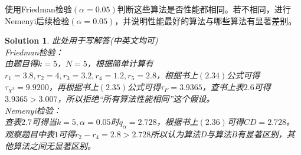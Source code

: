 \documentclass[a4paper,UTF8]{article}
\numberwithin{equation}{section}
\newtheorem*{mySol}{Solution}
\begin{document}
使用Friedman检验$(\alpha=0.05)$判断这些算法是否性能都相同。若不相同，进行Nemenyi后续检验$(\alpha=0.05)$，并说明性能最好的算法与哪些算法有显著差别。
\begin{mySol}
此处用于写解答(中英文均可)\\
Friedman检验：\\
由题目得$k=5$，$N=5$，根据简单计算有$r_1=3.8, r_2=4, r_3=3.2, r_4=1.2, r_5=2.8$，根据书上$(2.34)$公式可得$\tau_{\chi^2} = 9.9200$，再根据书上$(2.35)$公式可得$\tau_F=3.9365$，查书上表$2.6$可得$3.9365 > 3.007 $，所以拒绝“所有算法性能相同”这个假设。\\
Nemenyi检验：\\
查表$2.7$可得当$k=5,\alpha=0.05$时$q_\alpha=2.728$，根据书上$(2.36)$可得$CD = 2.728$。观察题目中表$1$可得$r_2-r_4 = 2.8>2.728$所以认为算法D与算法B有显著区别，其他算法之间无显著区别。
\end{mySol}

\newpage
\end{document}
